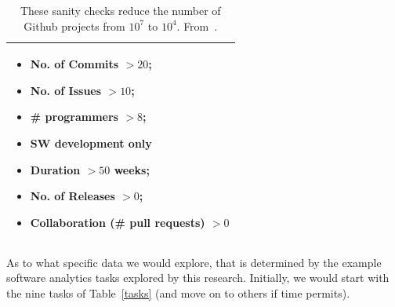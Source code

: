 \begin{table}
{\small
\begin{tabular}{|p{2.1in}|}\hline 
\rowcolor{blue!10}\begin{itemize}[leftmargin=*]
\item
No. of Commits $> 20$;
\item
No. of Issues $> 10$;
\item
\# programmers $> 8$;
\item
SW development only 
\item Duration $> 50$ weeks;
\item
No. of Releases $> 0$; 
\item
Collaboration (\# pull requests) $> 0$
\end{itemize} \\\hline
\end{tabular}}
\caption{These sanity checks  reduce the number of
Github projects from $10^7$ to $10^4$.
From~\cite{5069475,Kalliamvakou2014,Munaiah2017}.}\label{tbl:sanity}
\end{table} As to what specific data we would explore, that is determined by the example software analytics tasks 
explored by this research.  Initially, we would start with the nine tasks  of Table~\ref{tasks} (and move on to others if time permits).



